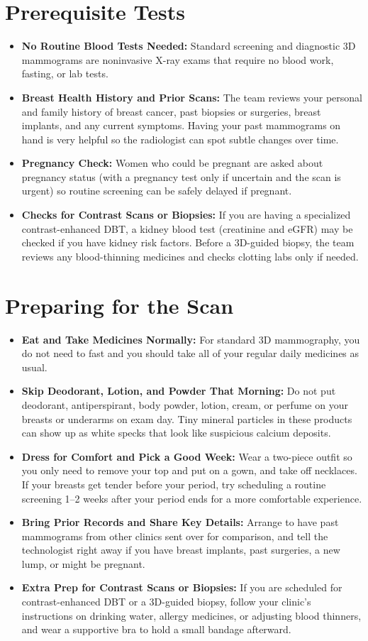 \section{Prerequisite Tests}
\begin{itemize}
\item \textbf{No Routine Blood Tests Needed:} Standard screening and diagnostic 3D mammograms are noninvasive X-ray exams that require no blood work, fasting, or lab tests.
\item \textbf{Breast Health History and Prior Scans:} The team reviews your personal and family history of breast cancer, past biopsies or surgeries, breast implants, and any current symptoms. Having your past mammograms on hand is very helpful so the radiologist can spot subtle changes over time.
\item \textbf{Pregnancy Check:} Women who could be pregnant are asked about pregnancy status (with a pregnancy test only if uncertain and the scan is urgent) so routine screening can be safely delayed if pregnant.
\item \textbf{Checks for Contrast Scans or Biopsies:} If you are having a specialized contrast-enhanced DBT, a kidney blood test (creatinine and eGFR) may be checked if you have kidney risk factors. Before a 3D-guided biopsy, the team reviews any blood-thinning medicines and checks clotting labs only if needed.
\end{itemize}

\section{Preparing for the Scan}
\begin{itemize}
\item \textbf{Eat and Take Medicines Normally:} For standard 3D mammography, you do not need to fast and you should take all of your regular daily medicines as usual.
\item \textbf{Skip Deodorant, Lotion, and Powder That Morning:} Do not put deodorant, antiperspirant, body powder, lotion, cream, or perfume on your breasts or underarms on exam day. Tiny mineral particles in these products can show up as white specks that look like suspicious calcium deposits.
\item \textbf{Dress for Comfort and Pick a Good Week:} Wear a two-piece outfit so you only need to remove your top and put on a gown, and take off necklaces. If your breasts get tender before your period, try scheduling a routine screening 1--2 weeks after your period ends for a more comfortable experience.
\item \textbf{Bring Prior Records and Share Key Details:} Arrange to have past mammograms from other clinics sent over for comparison, and tell the technologist right away if you have breast implants, past surgeries, a new lump, or might be pregnant.
\item \textbf{Extra Prep for Contrast Scans or Biopsies:} If you are scheduled for contrast-enhanced DBT or a 3D-guided biopsy, follow your clinic's instructions on drinking water, allergy medicines, or adjusting blood thinners, and wear a supportive bra to hold a small bandage afterward.
\end{itemize}

